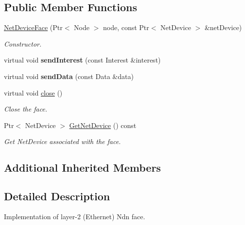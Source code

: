 \subsection*{Public Member Functions}
\begin{DoxyCompactItemize}
\item 
\hyperlink{classns3_1_1ndn_1_1NetDeviceFace_af2eed1635de5dc8821ed5fd1f3df1f6d}{Net\+Device\+Face} (Ptr$<$ Node $>$ node, const Ptr$<$ Net\+Device $>$ \&net\+Device)
\begin{DoxyCompactList}\small\item\em Constructor. \end{DoxyCompactList}\item 
virtual void {\bfseries send\+Interest} (const Interest \&interest)\hypertarget{classns3_1_1ndn_1_1NetDeviceFace_ab5a21e4074ed8d17f7216e90d00dff80}{}\label{classns3_1_1ndn_1_1NetDeviceFace_ab5a21e4074ed8d17f7216e90d00dff80}

\item 
virtual void {\bfseries send\+Data} (const Data \&data)\hypertarget{classns3_1_1ndn_1_1NetDeviceFace_a0f287a5d45381eaa94aa5cc724b2ada4}{}\label{classns3_1_1ndn_1_1NetDeviceFace_a0f287a5d45381eaa94aa5cc724b2ada4}

\item 
virtual void \hyperlink{classns3_1_1ndn_1_1NetDeviceFace_a837ac0a60dcb5b15db9fa08e9756edd9}{close} ()
\begin{DoxyCompactList}\small\item\em Close the face. \end{DoxyCompactList}\item 
Ptr$<$ Net\+Device $>$ \hyperlink{classns3_1_1ndn_1_1NetDeviceFace_abe003a2fe6c62b38c89fc2210550bf0c}{Get\+Net\+Device} () const
\begin{DoxyCompactList}\small\item\em Get Net\+Device associated with the face. \end{DoxyCompactList}\end{DoxyCompactItemize}
\subsection*{Additional Inherited Members}


\subsection{Detailed Description}
Implementation of layer-\/2 (Ethernet) Ndn face. 

